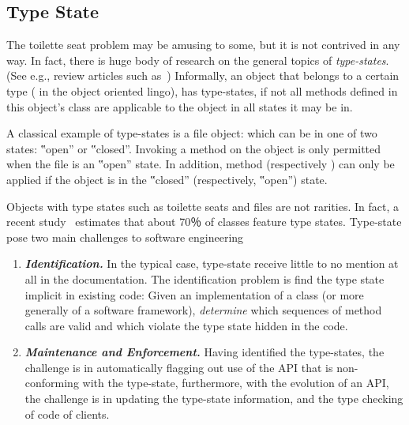 \subsection{Type State}
The toilette seat problem may be amusing to some, but it is not contrived in any way.
In fact, there is huge body of research on the general topics of
  \emph{type-states}. (See e.g., review articles such as~\cite{Tom:Jerry:2001,Ben:Jerry:1934})
Informally, an object that belongs to a certain type ( in the
object oriented lingo), has type-states, if not all methods defined in this object's class are applicable to the object in all states it may be in.

A classical example of type-states is a file object: which can be in one of two states:
‟open” or ‟closed”. Invoking a  method on the object is only permitted when the file is an ‟open” state.
In addition, method  (respectively ) can only be applied if the object is in the ‟closed” (respectively, ‟open”) state.

Objects with type states such as toilette seats and files are not rarities.
In fact, a recent study~\cite{Search:For:Aldrich} estimates 
  that about 70％ of \Java classes feature type states.
Type-state pose two main challenges to software engineering 
\begin{enumerate}
  \item \emph{\textbf{Identification.}} 
    In the typical case, type-state 
        receive little to no mention at all in the documentation.
    The identification problem is find the
    type state implicit in existing code: Given an implementation of a class
    (or more generally of a software framework), 
    \emph{determine} which sequences of method calls are valid and which violate the 
    type state hidden in the code.
  \item \emph{\textbf{Maintenance and Enforcement.}}
    Having identified the type-states, the challenge is in automatically flagging out 
      use of the API that is non-conforming with the type-state, furthermore, with the 
      evolution of an API, the challenge is in updating the type-state information, 
      and the type checking of code of clients. 
\end{enumerate}
